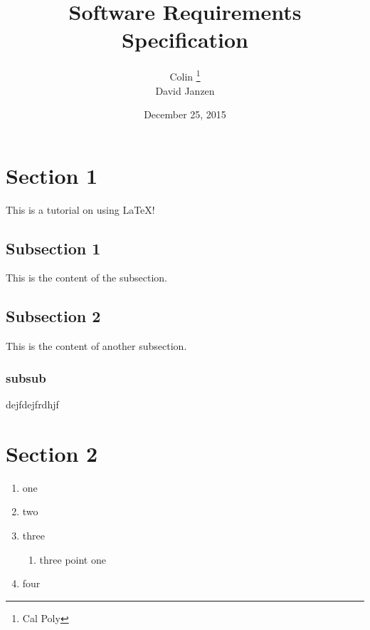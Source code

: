 \documentclass[12pt,a4paper]{report}
\title{Software Requirements Specification}
\date{December 25, 2015}
\author{Colin \thanks{Cal Poly} \\ David Janzen}
\begin{document}
\begin{CJK*}{UTF8}{gbsn}
\maketitle

\section*{Section 1}
This is a tutorial on using \LaTeX !

\subsection{Subsection 1}
This is the content of the subsection.
\subsection*{Subsection 2}
This is the content of another subsection.
\subsubsection{subsub}
dejfdejfrdhjf


\section{Section 2}
\begin{enumerate}
\renewcommand{\labelenumi}{{\textbf{\arabic{enumi}.}}}
\item one
\item two
\item three
   \begin{enumerate}
   \renewcommand{\labelenumii}{\textbf{\arabic{enumi}.\arabic{enumii}.}}
   \item three point one
   \end{enumerate}
\item four
\end{enumerate}


\end{CJK*}
\end{document}
